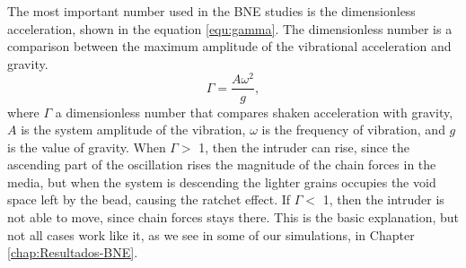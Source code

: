     The most important number used in the BNE studies is the dimensionless acceleration, shown in the equation \ref{equ:gamma}. The dimensionless number is a comparison between the maximum amplitude of the vibrational acceleration and gravity. 
\begin{equation}
    \label{equ:gamma}
    \Gamma = \frac{A\omega^{2}}{g},
\end{equation}
where $\Gamma$ a dimensionless number that compares shaken acceleration with gravity, $A$ is the system amplitude of the vibration, $\omega$ is the frequency of vibration, and $g$ is the value of gravity. When $\Gamma > $ 1, then the intruder can rise, since the ascending part of the oscillation rises the magnitude of the chain forces in the media, but when the system is descending the lighter grains occupies the void space left by the bead, causing the ratchet effect. If $\Gamma < $ 1, then the intruder is not able to move, since chain forces stays there. This is the basic explanation, but not all cases work like it, as we see in some of our simulations, in Chapter \ref{chap:Resultados-BNE}.


